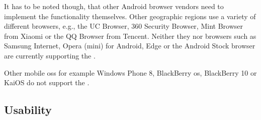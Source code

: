 \newpage

It has to be noted though, that other Android browser vendors need to implement the functionality themselves. Other geographic regions use a variety of different browsers, e.g., the UC Browser, 360 Security Browser, Mint Browser from Xiaomi or the QQ Browser from Tencent. Neither they nor browsers such as Samsung Internet, Opera (mini) for Android, Edge or the Android Stock browser are currently supporting the \wa.

Other mobile \glspl{os} for example Windows Phone 8, BlackBerry \gls{os}, BlackBerry 10 or KaiOS do not support the \wa.

\subsection{Usability}























